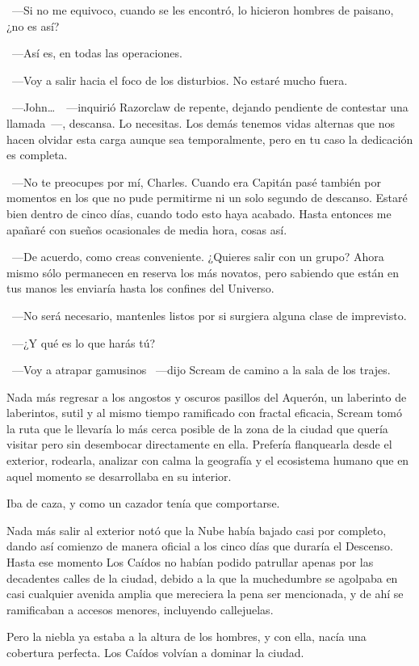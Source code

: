 ~---Si no me equivoco, cuando se les encontró, lo hicieron hombres de paisano, ¿no es así?

~---Así es, en todas las operaciones.

~---Voy a salir hacia el foco de los disturbios. No estaré mucho fuera.

~---John\dots\ ~---inquirió Razorclaw de repente, dejando pendiente de contestar una llamada~---, descansa. Lo necesitas. Los demás tenemos vidas alternas que nos hacen olvidar esta carga aunque sea temporalmente, pero en tu caso la dedicación es completa.

~---No te preocupes por mí, Charles. Cuando era Capitán pasé también por momentos en los que no pude permitirme ni un solo segundo de descanso. Estaré bien dentro de cinco días, cuando todo esto haya acabado. Hasta entonces me apañaré con sueños ocasionales de media hora, cosas así.

~---De acuerdo, como creas conveniente. ¿Quieres salir con un grupo? Ahora mismo sólo permanecen en reserva los más novatos, pero sabiendo que están en tus manos les enviaría hasta los confines del Universo.

~---No será necesario, mantenles listos por si surgiera alguna clase de imprevisto.

~---¿Y qué es lo que harás tú?

~---Voy a atrapar gamusinos ~---dijo Scream de camino a la sala de los trajes.

\bigskip\noindent
Nada más regresar a los angostos y oscuros pasillos del Aquerón, un laberinto de laberintos, sutil y al mismo tiempo ramificado con fractal eficacia, Scream tomó la ruta que le llevaría lo más cerca posible de la zona de la ciudad que quería visitar pero sin desembocar directamente en ella. Prefería flanquearla desde el exterior, rodearla, analizar con calma la geografía y el ecosistema humano que en aquel momento se desarrollaba en su interior.

Iba de caza, y como un cazador tenía que comportarse.

Nada más salir al exterior notó que la Nube había bajado casi por completo, dando así comienzo de manera oficial a los cinco días que duraría el Descenso. Hasta ese momento Los Caídos no habían podido patrullar apenas por las decadentes calles de la ciudad, debido a la que la muchedumbre se agolpaba en casi cualquier avenida amplia que mereciera la pena ser mencionada, y de ahí se ramificaban a accesos menores, incluyendo callejuelas.

Pero la niebla ya estaba a la altura de los hombres, y con ella, nacía una cobertura perfecta. Los Caídos volvían a dominar la ciudad.

